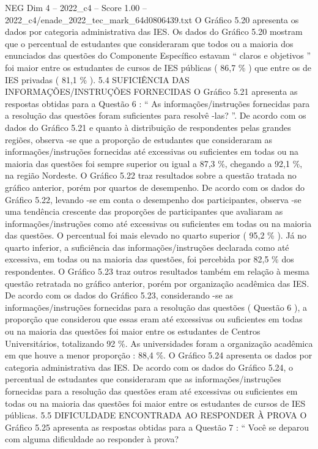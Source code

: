 \begin{textsample}{NEG Dim 4 – 2022\_c4 – Score 1.00 – 2022\_c4/enade\_2022\_tec\_mark\_64d0806439.txt}
O Gráfico 5.20 apresenta os dados por categoria administrativa das IES.
Os dados do Gráfico 5.20 mostram que o percentual de estudantes que consideraram que todos ou a maioria dos enunciados das questões do Componente Específico estavam “ claros e objetivos ” foi maior entre os estudantes de cursos de IES públicas ( 86,7 \% ) que entre os de IES privadas ( 81,1 \% ). 5.4 SUFICIÊNCIA DAS INFORMAÇÕES/INSTRUÇÕES FORNECIDAS O Gráfico 5.21 apresenta as respostas obtidas para a Questão 6 : “ As informações/instruções fornecidas para a resolução das questões foram suficientes para resolvê -las? ”.
De acordo com os dados do Gráfico 5.21 e quanto à distribuição de respondentes pelas grandes regiões, observa -se que a proporção de estudantes que consideraram as informações/instruções fornecidas até excessivas ou suficientes em todas ou na maioria das questões foi sempre superior ou igual a 87,3 \%, chegando a 92,1 \%, na região Nordeste.
O Gráfico 5.22 traz resultados sobre a questão tratada no gráfico anterior, porém por quartos de desempenho.
De acordo com os dados do Gráfico 5.22, levando -se em conta o desempenho dos participantes, observa -se uma tendência crescente das proporções de participantes que avaliaram as informações/instruções como até excessivas ou suficientes em todas ou na maioria das questões.
O percentual foi mais elevado no quarto superior ( 95,2 \% ).
Já no quarto inferior, a suficiência das informações/instruções declarada como até excessiva, em todas ou na maioria das questões, foi percebida por 82,5 \% dos respondentes.
O Gráfico 5.23 traz outros resultados também em relação à mesma questão retratada no gráfico anterior, porém por organização acadêmica das IES.
De acordo com os dados do Gráfico 5.23, considerando -se as informações/instruções fornecidas para a resolução das questões ( Questão 6 ), a proporção que considerou que essas eram até excessivas ou suficientes em todas ou na maioria das questões foi maior entre os estudantes de Centros Universitários, totalizando 92 \%.
As universidades foram a organização acadêmica em que houve a menor proporção : 88,4 \%.
O Gráfico 5.24 apresenta os dados por categoria administrativa das IES.
De acordo com os dados do Gráfico 5.24, o percentual de estudantes que consideraram que as informações/instruções fornecidas para a resolução das questões eram até excessivas ou suficientes em todas ou na maioria das questões foi maior entre os estudantes de cursos de IES públicas. 5.5 DIFICULDADE ENCONTRADA AO RESPONDER À PROVA O Gráfico 5.25 apresenta as respostas obtidas para a Questão 7 : “ Você se deparou com alguma dificuldade ao responder à prova?

\end{textsample}
